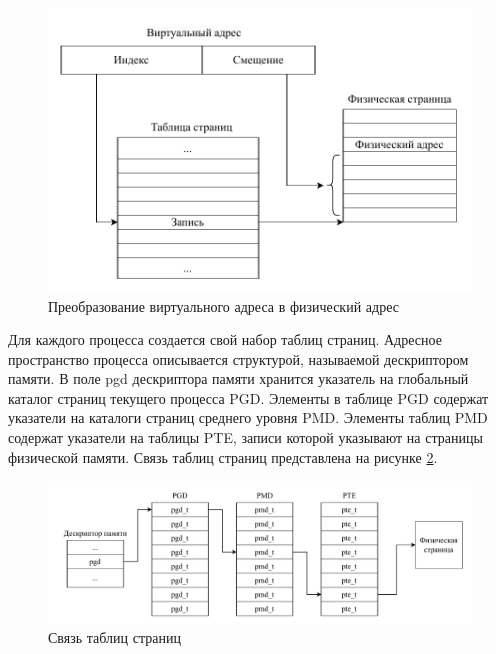 \begin{figure}[H]
	\begin{center}
		\includegraphics[scale=0.7]{inc/img/address-translation.pdf}
	\end{center}
	\captionsetup{justification=centering}
	\caption{Преобразование виртуального адреса в физический адрес}
	\label{img:address-translation}
\end{figure}
    
Для каждого процесса создается свой набор таблиц страниц. Адресное пространство процесса описывается структурой, называемой дескриптором памяти. В поле pgd дескриптора памяти хранится указатель на глобальный каталог страниц текущего процесса PGD. Элементы в таблице PGD содержат указатели на каталоги страниц среднего уровня PMD. Элементы таблиц PMD содержат указатели на таблицы PTE, записи которой указывают на страницы физической памяти. Связь таблиц страниц представлена на рисунке \ref{img:page-tables}.

\begin{figure}[H]
	\begin{center}
		\includegraphics[scale=0.75]{inc/img/page-tables.pdf}
	\end{center}
	\captionsetup{justification=centering}
	\caption{Связь таблиц страниц}
	\label{img:page-tables}
\end{figure}

